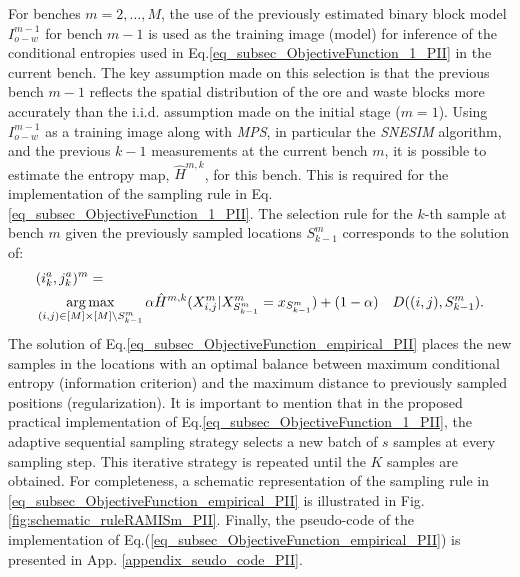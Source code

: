 For benches $m = 2, \ldots, M$, the use of the previously estimated binary block model  $I_{o-w}^{m-1}$  for bench $m-1$ is used as the training image (model) for inference of the conditional entropies used in Eq.\eqref{eq_subsec_ObjectiveFunction_1_PII} in the current bench.  
The key assumption made on this selection is that the previous bench $m - 1$ reflects the spatial distribution of the ore and waste blocks more accurately than the i.i.d. assumption made on the initial stage ($m = 1$). 
Using $I_{o-w}^{m-1}$ as a training image along with \emph{MPS}, in particular the \emph{SNESIM} algorithm,  
and the previous $k-1$ measurements at the current bench $m$, it is possible to estimate the entropy map, $\hat{H}^{m,k}$, for this bench. This is required for the implementation of the sampling rule in Eq.\eqref{eq_subsec_ObjectiveFunction_1_PII}.  The selection rule for the $k$-th sample at bench $m$ given the previously sampled locations $S_{k-1}^{m}$ corresponds to the solution of:
\begin{align}
\label{eq_subsec_ObjectiveFunction_empirical_PII}
&(i^a_k,j^a_k)^{m} =\nonumber\\ 
& \operatorname*{arg\,max}_{(i,j)\in [M]\times [M] \setminus S_{k-1}^{m}} \alpha  \hat{H}^{m,k}(X_{i,j}^{m}| X_{S_{k-1}^{m}}^{m} = x_{S_{k-1}^{m}} )  + (1 - \alpha) & D((i,j), S_{k-1}^{m}).
\end{align}
The solution of Eq.\eqref{eq_subsec_ObjectiveFunction_empirical_PII} places the new samples in the locations with an optimal balance between maximum conditional entropy (information criterion) and the maximum distance to previously sampled positions (regularization). It is important to mention that in the proposed practical implementation of  Eq.\eqref{eq_subsec_ObjectiveFunction_1_PII}, the adaptive sequential sampling strategy selects a new batch of $s$ samples at every sampling step. This iterative strategy is repeated until the $K$ samples are obtained. For completeness, a schematic representation of the sampling rule in \eqref{eq_subsec_ObjectiveFunction_empirical_PII} is illustrated in Fig. \ref{fig:schematic_ruleRAMISm_PII}. Finally, the pseudo-code of the implementation of Eq.(\ref{eq_subsec_ObjectiveFunction_empirical_PII}) is presented in App. \ref{appendix_seudo_code_PII}.

